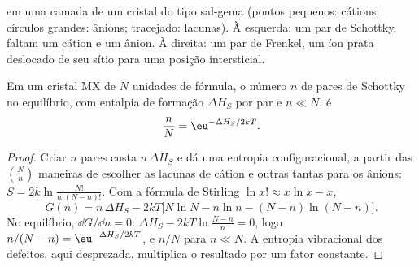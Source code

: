 \begin{omfigure}

{\small {} em uma camada de um cristal do tipo sal-gema (pontos pequenos: cátions;
círculos grandes: ânions; tracejado: lacunas). À esquerda: um par de Schottky, faltam um cátion
e um ânion. À direita: um par de Frenkel, um íon prata deslocado de seu sítio
para uma posição intersticial.}
\end{omfigure}

\begin{theorem}\label{thm:b3:solid-state:schottky}
Em um cristal MX de $N$ unidades de fórmula, o número $n$ de pares de Schottky no
equilíbrio, com entalpia de formação $\Delta H_S$ por par e $n \ll N$, é
\[
  \frac{n}{N} = \eu^{-\Delta H_S/2kT}.
\]
\end{theorem}

\begin{proof}
Criar $n$ pares custa $n\,\Delta H_S$ e dá uma entropia configuracional, a partir das
$\binom{N}{n}$ maneiras de escolher as lacunas de cátion e outras tantas para os ânions:
$S = 2k\ln\frac{N!}{n!(N - n)!}$. Com a fórmula de Stirling $\ln x! \approx x\ln x - x$,
\[
  G(n) = n\,\Delta H_S - 2kT\bigl[N\ln N - n\ln n - (N - n)\ln(N - n)\bigr].
\]
No equilíbrio, $\dd G/\dd n = 0$: $\Delta H_S - 2kT\ln\frac{N - n}{n} = 0$, logo $n/(N - n) = \eu^{-\Delta H_S/2kT}$, e $n/N$ para
$n \ll N$. A entropia vibracional dos defeitos, aqui desprezada, multiplica o
resultado por um fator constante.
\end{proof}

